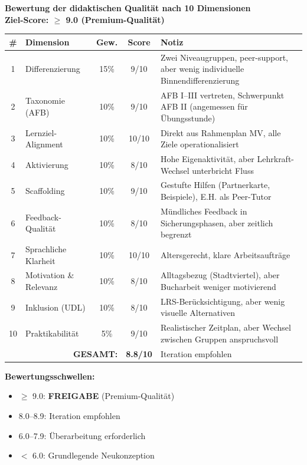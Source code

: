 \documentclass[11pt,a4paper]{article}
\begin{document}
\begin{scorebox}
\textbf{Bewertung der didaktischen Qualität nach 10 Dimensionen}\\
\textbf{Ziel-Score: $\geq$ 9.0 (Premium-Qualität)}

\vspace{1em}
\begin{tabular}{|c|l|c|c|p{4.5cm}|}
\hline
\textbf{\#} & \textbf{Dimension} & \textbf{Gew.} & \textbf{Score} & \textbf{Notiz} \\
\hline
1 & Differenzierung & 15\% & 9/10 & Zwei Niveaugruppen, peer-support, aber wenig individuelle Binnendifferenzierung \\
\hline
2 & Taxonomie (AFB) & 10\% & 9/10 & AFB I--III vertreten, Schwerpunkt AFB II (angemessen für Übungsstunde) \\
\hline
3 & Lernziel-Alignment & 10\% & 10/10 & Direkt aus Rahmenplan MV, alle Ziele operationalisiert \\
\hline
4 & Aktivierung & 10\% & 8/10 & Hohe Eigenaktivität, aber Lehrkraft-Wechsel unterbricht Fluss \\
\hline
5 & Scaffolding & 10\% & 9/10 & Gestufte Hilfen (Partnerkarte, Beispiele), E.H. als Peer-Tutor \\
\hline
6 & Feedback-Qualität & 10\% & 8/10 & Mündliches Feedback in Sicherungsphasen, aber zeitlich begrenzt \\
\hline
7 & Sprachliche Klarheit & 10\% & 10/10 & Altersgerecht, klare Arbeitsaufträge \\
\hline
8 & Motivation \& Relevanz & 10\% & 8/10 & Alltagsbezug (Stadtviertel), aber Bucharbeit weniger motivierend \\
\hline
9 & Inklusion (UDL) & 10\% & 8/10 & LRS-Berücksichtigung, aber wenig visuelle Alternativen \\
\hline
10 & Praktikabilität & 5\% & 9/10 & Realistischer Zeitplan, aber Wechsel zwischen Gruppen anspruchsvoll \\
\hline
\multicolumn{3}{|r|}{\textbf{GESAMT:}} & \textbf{8.8/10} & \textcolor{warningorange}{Iteration empfohlen} \\
\hline
\end{tabular}

\vspace{1em}
\textbf{Bewertungsschwellen:}
\begin{itemize}
    \item[$\Box$] \textcolor{successgreen}{$\geq$ 9.0: \textbf{FREIGABE} (Premium-Qualität)}
    \item[$\boxtimes$] \textcolor{warningorange}{8.0--8.9: Iteration empfohlen}
    \item[$\Box$] 6.0--7.9: Überarbeitung erforderlich
    \item[$\Box$] $<$ 6.0: Grundlegende Neukonzeption
\end{itemize}


\end{scorebox}
\end{document}
